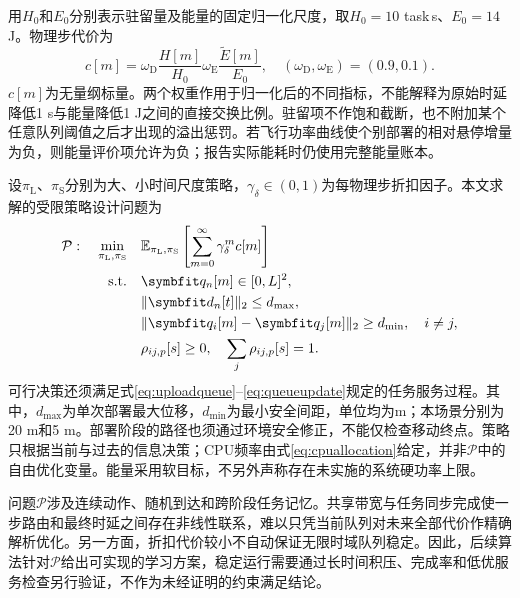 用$H_0$和$E_0$分别表示驻留量及能量的固定归一化尺度，取$H_0=10$ task\,s、$E_0=14$ J。物理步代价为
\begin{equation}
 c[m]=\omega_{\mathrm D}\frac{H[m]}{H_0}
 \omega_{\mathrm E}\frac{\widetilde E[m]}{E_0},
 \quad(\omega_{\mathrm D},\omega_{\mathrm E})=(0.9,0.1).
 \label{eq:cost}
\end{equation}
$c[m]$为无量纲标量。两个权重作用于归一化后的不同指标，不能解释为原始时延降低1 s与能量降低1 J之间的直接交换比例。驻留项不作饱和截断，也不附加某个任意队列阈值之后才出现的溢出惩罚。若飞行功率曲线使个别部署的相对悬停增量为负，则能量评价项允许为负；报告实际能耗时仍使用完整能量账本。

设$\pi_{\mathrm L}$、$\pi_{\mathrm S}$分别为大、小时间尺度策略，$\gamma_\delta\in(0,1)$为每物理步折扣因子。本文求解的受限策略设计问题为
\begin{equation}
 \begin{aligned}
 \mathcal P:\quad
 \min_{\pi_{\mathrm L},\pi_{\mathrm S}}\quad&
 \E_{\pi_{\mathrm L},\pi_{\mathrm S}}
 \left[\sum_{m=0}^{\infty}\gamma_\delta^m c[m]\right]\\
 \text{s.t.}\quad&
 \vct q_n[m]\in[0,L]^2,\\
 &\|\vct d_n[t]\|_2\le d_{\max},\\
 &\|\vct q_i[m]-\vct q_j[m]\|_2\ge d_{\min},\quad i\ne j,\\
 &\rho_{ij,p}[s]\ge0,\quad\sum_j\rho_{ij,p}[s]=1.
 \end{aligned}
 \label{eq:problem}
\end{equation}
可行决策还须满足式\eqref{eq:uploadqueue}--\eqref{eq:queueupdate}规定的任务服务过程。其中，$d_{\max}$为单次部署最大位移，$d_{\min}$为最小安全间距，单位均为m；本场景分别为20 m和5 m。部署阶段的路径也须通过环境安全修正，不能仅检查移动终点。策略只根据当前与过去的信息决策；CPU频率由式\eqref{eq:cpuallocation}给定，并非$\mathcal P$中的自由优化变量。能量采用软目标，不另外声称存在未实施的系统硬功率上限。

问题$\mathcal P$涉及连续动作、随机到达和跨阶段任务记忆。共享带宽与任务同步完成使一步路由和最终时延之间存在非线性联系，难以只凭当前队列对未来全部代价作精确解析优化。另一方面，折扣代价较小不自动保证无限时域队列稳定。因此，后续算法针对$\mathcal P$给出可实现的学习方案，稳定运行需要通过长时间积压、完成率和低优服务检查另行验证，不作为未经证明的约束满足结论。

